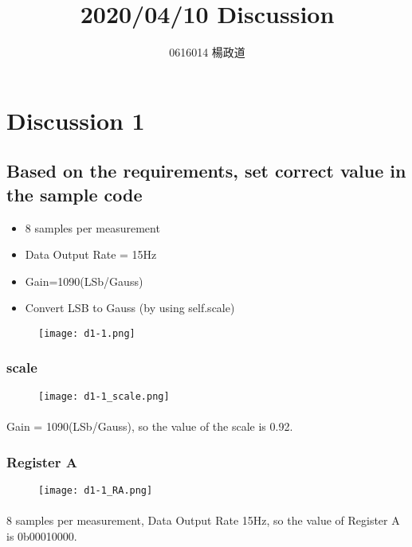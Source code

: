 \title{2020/04/10 Discussion}
\author{0616014 楊政道}
\maketitle
\thispagestyle{fancy}
\section{Discussion 1}
\subsection{Based on the requirements, set correct value in the sample code}
\begin{itemize}
    \item 8 samples per measurement
    \item Data Output Rate = 15Hz
    \item Gain=1090(LSb/Gauss)
    \item Convert LSB to Gauss (by using self.scale)
\end{itemize}
\begin{figure}[!h]
    \begin{center}
        \texttt{[image: d1-1.png]}
    \end{center}
\end{figure}
\subsubsection{scale}
\begin{figure}[!h]
    \begin{center}
        \texttt{[image: d1-1\_scale.png]}
    \end{center}
\end{figure}
\paragraph{}
Gain = 1090(LSb/Gauss), so the value of the scale is 0.92.
\newpage
\subsubsection{Register A}
\begin{figure}[!h]
    \begin{center}
        \texttt{[image: d1-1\_RA.png]}
    \end{center}
\end{figure}
\paragraph{}
8 samples per measurement, Data Output Rate 15Hz, so the value of Register A is 0b00010000.
